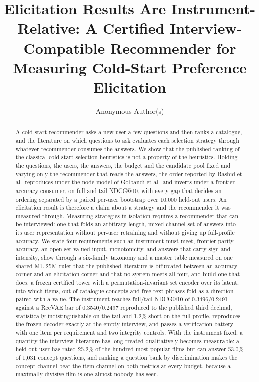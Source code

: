 \documentclass[acmsmall,review,anonymous]{acmart}
\begin{document}
\title[Elicitation Results Are Instrument-Relative]{Elicitation Results Are Instrument-Relative: A Certified Interview-Compatible Recommender for Measuring Cold-Start Preference Elicitation}

\author{Anonymous Author(s)}

\renewcommand{\shortauthors}{Anonymous et al.}

\begin{abstract}
A cold-start recommender asks a new user a few questions and then ranks a catalogue, and the literature on which questions to ask evaluates each selection strategy through whatever recommender consumes the answers. We show that the published ranking of the classical cold-start selection heuristics is not a property of the heuristics. Holding the questions, the users, the answers, the budget and the candidate pool fixed and varying only the recommender that reads the answers, the order reported by Rashid et al.\ reproduces under the node model of Golbandi et al.\ and inverts under a frontier-accuracy consumer, on full and tail NDCG@10, with every gap that decides an ordering separated by a paired per-user bootstrap over 10,000 held-out users. An elicitation result is therefore a claim about a strategy and the recommender it was measured through. Measuring strategies in isolation requires a recommender that can be interviewed: one that folds an arbitrary-length, mixed-channel set of answers into its user representation without per-user retraining and without giving up full-profile accuracy. We state four requirements such an instrument must meet, frontier-parity accuracy, an open set-valued input, monotonicity, and answers that carry sign and intensity, show through a six-family taxonomy and a master table measured on one shared ML-25M ruler that the published literature is bifurcated between an accuracy corner and an elicitation corner and that no system meets all four, and build one that does: a frozen certified tower with a permutation-invariant set encoder over its latent, into which items, out-of-catalogue concepts and free-text phrases fold as a direction paired with a value. The instrument reaches full/tail NDCG@10 of 0.3496/0.2491 against a RecVAE bar of 0.3540/0.2497 reproduced to the published third decimal, statistically indistinguishable on the tail and 1.2\% short on the full profile, reproduces the frozen decoder exactly at the empty interview, and passes a verification battery with one item per requirement and two integrity controls. With the instrument fixed, a quantity the interview literature has long treated qualitatively becomes measurable: a held-out user has rated 25.2\% of the hundred most popular films but can answer 53.0\% of 1,031 concept questions, and ranking a question bank by discrimination makes the concept channel beat the item channel on both metrics at every budget, because a maximally divisive film is one almost nobody has seen.
\end{abstract}
\end{document}
